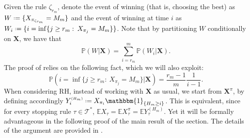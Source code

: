 \documentclass[11pt, a4paper, twoside]{article}
\newcommand*{\defeq}{\mathrel{\vcenter{\baselineskip0.5ex \lineskiplimit0pt
			\hbox{\scriptsize.}\hbox{\scriptsize.}}}=}
\newcommand{\ssup}[1]{{\scriptscriptstyle{({#1})}}}
\newcommand{\EE}{\mathbb{E}}
\newcommand{\PP}{\mathbb{P}}
\newcommand{\TT}{\mathcal{T}}
\newcommand{\XX}{\mathbf{X}}
\newcommand{\II}{\mathbbm{1}}
\numberwithin{equation}{section}
\begin{document}
	Given the rule $\zeta_{r_m}$, denote the event of winning (that is, choosing the best) as $W\defeq\{X_{\pi_{\zeta_{r_m}}}=M_m\}$ and the event of winning at time $i$ as $W_i\defeq \{i=\inf\{j\ge r_m:\:X_{\pi_j}=M_m\}\}$. Note that by partitioning $W$ conditionally on $\XX$, 
	we have that 
	\begin{equation}\label{W}
		\PP(W|\XX)=\sum_{i=r_m}^m \PP(W_i|\XX).
	\end{equation}
The proof of  relies on the following fact, which we will also exploit:
	\begin{equation}\label{W_i}
		\PP\left(i=\inf\{j\ge r_m:\:X_{\pi_j}=M_m\}|\XX\right)=\frac{r_m-1}{m}\frac{1}{i-1}.
	\end{equation}   
When considering RH, instead of working with $\XX$ as usual, we start from $\XX^\pi$, by defining accordingly $Y_i^\ssup{H_m}\defeq X_{\pi_i}\II_{\{H_m\ge i\}}$. This is equivalent, since for every stopping rule $\tau\in\TT^*$, $\EE X_\tau=\EE X_\tau^\pi=\EE Y_\tau^{\ssup{H_m}}$. Yet it will be formally advantageous in the following proof of the main result of the section. The details of the argument are provided in .
\end{document}
